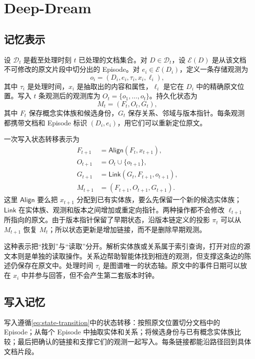 \section{Deep-Dream}
\label{sec:deep-dream}

\subsection{记忆表示}

设 $\mathcal D_t$ 是截至处理时刻 $t$ 已处理的文档集合。对 $D\in\mathcal D_t$，设 $\mathcal E(D)$ 是从该文档不可修改的原文片段中切分出的 Episode。对 $e_i\in\mathcal E(D_i)$，定义一条存储观测为
\[
o_i=(D_i,e_i,\tau_i,x_i,\ell_i),
\]
其中 $\tau_i$ 是处理时间，$x_i$ 是抽取出的内容和属性，$\ell_i$ 是它在 $D_i$ 中的精确原文位置。写入 $t$ 条观测后的观测库为 $O_t=\{o_1,\ldots,o_t\}$。持久化状态为
\[
M_t=(F_t,O_t,G_t),
\]
其中 $F_t$ 保存概念实体族和候选身份，$G_t$ 保存关系、邻域与版本指针。每条观测都携带文档和 Episode 标识 $(D_i,e_i)$，用它们可以重新定位原文。

一次写入状态转移表示为
\begin{equation}
\begin{aligned}
F_{t+1}&=\mathsf{Align}(F_t,x_{t+1}),\\
O_{t+1}&=O_t\cup\{o_{t+1}\},\\
G_{t+1}&=\mathsf{Link}(G_t,F_{t+1},o_{t+1}),\\
M_{t+1}&=(F_{t+1},O_{t+1},G_{t+1}).
\end{aligned}
\label{eq:state-transition}
\end{equation}
这里 $\mathsf{Align}$ 要么把 $x_{t+1}$ 分配到已有实体族，要么先保留一个新的候选实体族；$\mathsf{Link}$ 在实体族、观测和版本之间增加或重定向指针。两种操作都不会修改 $\ell_{t+1}$ 所指向的原文。由于版本指针保留了早期状态，沿版本链定义的投影 $\pi_t$ 可以从 $M_{t+1}$ 恢复 $M_t$；所以状态更新是增加链接，而不是删除早期观测。

这种表示把“找到”与“读取”分开。解析实体族或关系属于索引查询，打开对应的源文本则是单独的读取操作。关系边帮助智能体找到相连的观测，但支撑这条边的陈述仍保存在原文中。处理时间 $\tau_i$ 是图谱唯一的状态轴。原文中的事件日期可以放在 $x_i$ 中并参与回答，但不会产生第二套版本时钟。

\subsection{写入记忆}

写入遵循\cref{eq:state-transition}中的状态转移：按照原文位置切分文档中的 Episode；从每个 Episode 中抽取实体和关系；将候选身份与已有概念实体族比较；最后把确认的链接和支撑它们的观测一起写入。每条链接都能沿路径回到具体文档片段。

